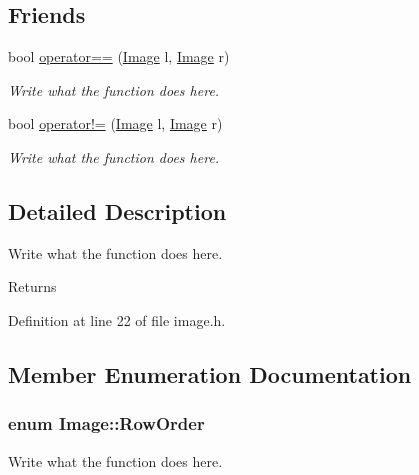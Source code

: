\subsection*{Friends}
\begin{DoxyCompactItemize}
\item 
bool \hyperlink{classImage_a2304aa1c9fbc445512db17eadc2c3f6f}{operator==} (\hyperlink{classImage}{Image} l, \hyperlink{classImage}{Image} r)
\begin{DoxyCompactList}\small\item\em Write what the function does here. \end{DoxyCompactList}\item 
bool \hyperlink{classImage_ac96614d2b0093664f753bb88a95c0815}{operator!=} (\hyperlink{classImage}{Image} l, \hyperlink{classImage}{Image} r)
\begin{DoxyCompactList}\small\item\em Write what the function does here. \end{DoxyCompactList}\end{DoxyCompactItemize}


\subsection{Detailed Description}
Write what the function does here. 

\begin{DoxyReturn}{Returns}

\end{DoxyReturn}


Definition at line 22 of file image.\+h.



\subsection{Member Enumeration Documentation}
\hypertarget{classImage_a856d0983e089ff127d0bcad3828c1aab}{
\subsubsection[{Row\+Order}]{\setlength{\rightskip}{0pt plus 5cm}enum {\bf Image\+::\+Row\+Order}\hspace{0.3cm}{\ttfamily [private]}}}\label{classImage_a856d0983e089ff127d0bcad3828c1aab}


Write what the function does here. 

